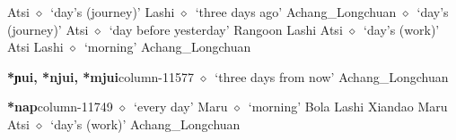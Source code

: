 \hspace{1ex}
         Atsi 
\hspace{1ex}
         $\diamond$~`day's (journey)'
         Lashi 
\hspace{1ex}
         $\diamond$~`three days ago'
         Achang\_Longchuan 
\hspace{1ex}
         $\diamond$~`day's (journey)'
         Atsi 
\hspace{1ex}
         $\diamond$~`day before yesterday'
         Rangoon 
\hspace{1ex}
         Lashi 
\hspace{1ex}
         Atsi 
\hspace{1ex}
         $\diamond$~`day's (work)'
         Atsi 
\hspace{1ex}
         Lashi 
\hspace{1ex}
         $\diamond$~`morning'
         Achang\_Longchuan 
  \item {\footnotesize \textbf{*ɲui, *njui, *mjui}}{\tiny column-11577}
         $\diamond$~`three days from now'
         Achang\_Longchuan 
  \item {\footnotesize \textbf{*nap}}{\tiny column-11749}
         $\diamond$~`every day'
         Maru 
\hspace{1ex}
         $\diamond$~`morning'
         Bola 
\hspace{1ex}
         Lashi 
\hspace{1ex}
         Xiandao 
\hspace{1ex}
         Maru 
\hspace{1ex}
         Atsi 
\hspace{1ex}
         $\diamond$~`day's (work)'
         Achang\_Longchuan 
\hspace{1ex}
